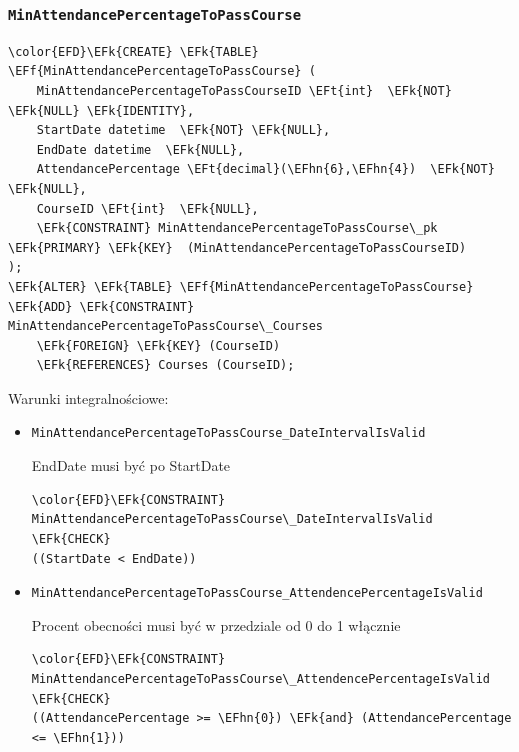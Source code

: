\documentclass[11pt]{article}
\newcommand{\EFk}[1]{\textcolor{EFk}{\textbf{#1}}} %
\newcommand{\EFf}[1]{\textcolor{EFf}{#1}} %
\newcommand{\EFt}[1]{\textcolor{EFt}{\textbf{#1}}} %
\newcommand{\EFhn}[1]{\textcolor{EFhn}{#1}} %
\begin{document}
\subsubsection{\texttt{MinAttendancePercentageToPassCourse}}
\label{sec:org2b2596f}
\begin{Code}
\begin{Verbatim}
\color{EFD}\EFk{CREATE} \EFk{TABLE} \EFf{MinAttendancePercentageToPassCourse} (
    MinAttendancePercentageToPassCourseID \EFt{int}  \EFk{NOT} \EFk{NULL} \EFk{IDENTITY},
    StartDate datetime  \EFk{NOT} \EFk{NULL},
    EndDate datetime  \EFk{NULL},
    AttendancePercentage \EFt{decimal}(\EFhn{6},\EFhn{4})  \EFk{NOT} \EFk{NULL},
    CourseID \EFt{int}  \EFk{NULL},
    \EFk{CONSTRAINT} MinAttendancePercentageToPassCourse\_pk \EFk{PRIMARY} \EFk{KEY}  (MinAttendancePercentageToPassCourseID)
);
\EFk{ALTER} \EFk{TABLE} \EFf{MinAttendancePercentageToPassCourse} \EFk{ADD} \EFk{CONSTRAINT} MinAttendancePercentageToPassCourse\_Courses
    \EFk{FOREIGN} \EFk{KEY} (CourseID)
    \EFk{REFERENCES} Courses (CourseID);
\end{Verbatim}
\end{Code}
Warunki integralnościowe:


\begin{itemize}
\item \texttt{MinAttendancePercentageToPassCourse\_DateIntervalIsValid}

EndDate musi być po StartDate
\begin{Code}
\begin{Verbatim}
\color{EFD}\EFk{CONSTRAINT} MinAttendancePercentageToPassCourse\_DateIntervalIsValid \EFk{CHECK}
((StartDate < EndDate))
\end{Verbatim}
\end{Code}
\item \texttt{MinAttendancePercentageToPassCourse\_AttendencePercentageIsValid}

Procent obecności musi być w przedziale od 0 do 1 włącznie
\begin{Code}
\begin{Verbatim}
\color{EFD}\EFk{CONSTRAINT} MinAttendancePercentageToPassCourse\_AttendencePercentageIsValid \EFk{CHECK}
((AttendancePercentage >= \EFhn{0}) \EFk{and} (AttendancePercentage <= \EFhn{1}))
\end{Verbatim}
\end{Code}
\end{itemize}
\end{document}

